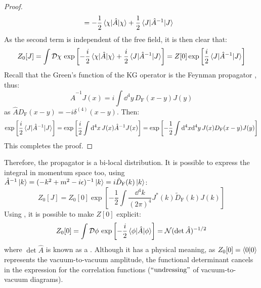 \begin{proofbox}
\begin{proof}
\begin{equation*}
\begin{split}
        & = - \frac{1}{2} \braket{\chi | \hat{A} | \chi} + \frac{1}{2} \braket{J | \hat{A}^{-1} | J}
      \end{split}
    \end{equation*}
    As the second term is independent of the free field, it is then clear that:
    \begin{equation*}
      Z_0[J] = \int \mathcal{D}\chi\, \exp \left[ - \frac{i}{2} \braket{\chi | \hat{A} | \chi} + \frac{i}{2} \braket{J | \hat{A}^{-1} | J} \right] = Z[0] \exp \left[ \frac{i}{2} \braket{J | \hat{A}^{-1} | J} \right]
    \end{equation*}
    Recall that the Green's function of the KG operator is the Feynman propagator , thus:
    \begin{equation*}
      \hat{A}^{-1} J(x) = i \int \dd^4y\, D_\text{F}(x - y) J(y)
    \end{equation*}
    as $ \hat{A} D_\text{F}(x-y) = -i \delta^{(4)}(x-y) $. Then:
    \begin{equation*}
      \exp \left[ \frac{i}{2} \braket{J | \hat{A}^{-1} | J} \right] = \exp \left[ \frac{i}{2} \int \mathrm{d}^4x\, J(x) \hat{A}^{-1} J(x) \right] = \exp \left[ -\frac{1}{2} \int \mathrm{d}^4x \mathrm{d}^4y\, J(x) D_\text{F}(x-y) J(y) \right]
    \end{equation*}
    This completes the proof.
  \end{proof}
\end{proofbox}

Therefore, the propagator is a bi-local distribution. It is possible to express the integral in momentum space too, using $ \hat{A}^{-1} \ket{k} = (-k^2 + m^2 -i\epsilon)^{-1} \ket{k} = i \tilde{D}_\text{F}(k) \ket{k} $:
\begin{equation}
  Z_0[J] = Z_0[0] \exp \left[ - \frac{1}{2} \int \frac{\dd^4k}{(2\pi)^4} J^*(k) \tilde{D}_\text{F}(k) J(k) \right]
\end{equation}
Using , it is possible to make $ Z[0] $ explicit:
\begin{equation}
  Z_0[0] = \int \mathcal{D}\phi\, \exp \left[ - \frac{i}{2} \braket{\phi | \hat{A} | \phi} \right] = \mathcal{N} (\det \hat{A})^{-1/2}
\end{equation}
where $ \det\hat{A} $ is known as a . Although it has a physical meaning, as $ Z_0[0] = \braket{0 | 0} $ represents the vacuum-to-vacuum amplitude, the functional determinant cancels in the expression for the correlation functions ($ ``\text{undressing}" $ of vacuum-to-vacuum diagrams).

